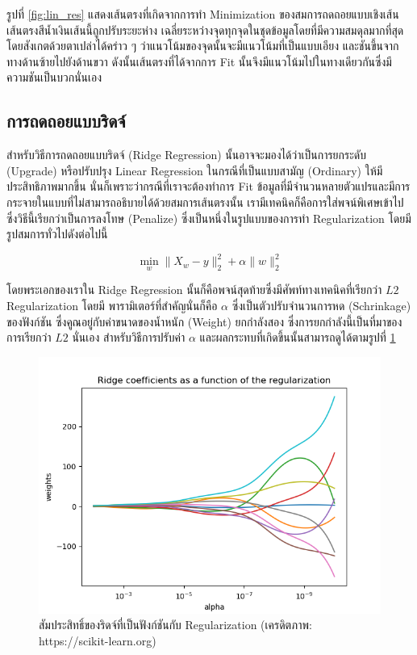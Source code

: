 รูปที่ \ref{fig:lin_res} แสดงเส้นตรงที่เกิดจากการทำ Minimization ของสมการถดถอยแบบเชิงเส้น เส้นตรงสีน้ำเงินเส้นนี้ถูกปรับระยะห่าง%
เฉลี่ยระหว่างจุดทุกจุดในชุดข้อมูลโดยที่มีความสมดุลมากที่สุด โดยสังเกตด้วยตาเปล่าได้คร่าว ๆ ว่าแนวโน้มของจุดนั้นจะมีแนวโน้มที่เป็นแบบเอียง%
และชันขึ้นจากทางด้านซ้ายไปยังด้านขวา ดังนั้นเส้นตรงที่ได้จากการ Fit นั้นจึงมีแนวโน้มไปในทางเดียวกันซึ่งมีความชันเป็นบวกนั่นเอง

\subsection{การถดถอยแบบริดจ์}
\label{ssec:ridge_reg}

สำหรับวิธีการถดถอยแบบริดจ์ (Ridge Regression) นั้นอาจจะมองได้ว่าเป็นการยกระดับ (Upgrade) หรือปรับปรุง Linear Regression 
ในกรณีที่เป็นแบบสามัญ (Ordinary) ให้มีประสิทธิภาพมากขึ้น นั่นก็เพราะว่ากรณีที่เราจะต้องทำการ Fit ข้อมูลที่มีจำนวนหลายตัวแปรและมีการ%
กระจายในแบบที่ไม่สามารถอธิบายได้ด้วยสมการเส้นตรงนั้น เรามีเทคนิคก็คือการใส่พจน์พิเศษเข้าไป ซึ่งวิธีนี้เรียกว่าเป็นการลงโทษ (Penalize) 
ซึ่งเป็นหนึ่งในรูปแบบของการทำ Regularization โดยมีรูปสมการทั่วไปดังต่อไปนี้

\begin{equation}
    \min_{w} \lVert X_{w} - y \rVert_{2}^{2} + \alpha \lVert w \rVert_{2}^{2}
\end{equation}

\noindent โดยพระเอกของเราใน Ridge Regression นั้นก็คือพจน์สุดท้ายซึ่งมีศัพท์ทางเทคนิคที่เรียกว่า $L2$ Regularization โดยมี%
พารามิเตอร์ที่สำคัญนั่นก็คือ $\alpha$ ซึ่งเป็นตัวปรับจำนวนการหด (Schrinkage) ของฟังก์ชัน ซึ่งคูณอยู่กับค่าขนาดของน้ำหนัก (Weight) 
ยกกำลังสอง ซึ่งการยกกำลังนี้เป็นที่มาของการเรียกว่า $L2$ นั่นเอง สำหรับวิธีการปรับค่า $\alpha$ และผลกระทบที่เกิดขึ้นนั้นสามารถดูได้ตามรูปที่ 
\ref{fig:ridge_res}

\begin{figure}[htbp]
    \centering
    \includegraphics[width=0.9\linewidth]{fig/plot_ridge_regression.png}
    \caption{สัมประสิทธิ์ของริดจ์ที่เป็นฟังก์ชันกับ Regularization (เครดิตภาพ: https://scikit-learn.org)}
    \label{fig:ridge_res}
\end{figure}

